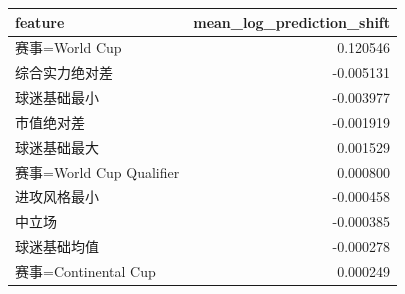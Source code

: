 \begin{tabular}{lr}
\toprule
feature & mean\_log\_prediction\_shift \\
\midrule
赛事=World Cup & 0.120546 \\
综合实力绝对差 & -0.005131 \\
球迷基础最小 & -0.003977 \\
市值绝对差 & -0.001919 \\
球迷基础最大 & 0.001529 \\
赛事=World Cup Qualifier & 0.000800 \\
进攻风格最小 & -0.000458 \\
中立场 & -0.000385 \\
球迷基础均值 & -0.000278 \\
赛事=Continental Cup & 0.000249 \\
\bottomrule
\end{tabular}
